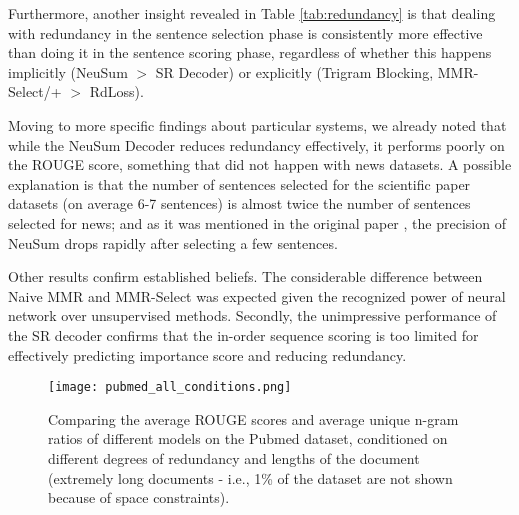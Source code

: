 \documentclass[11pt,a4paper]{article}
\begin{document}
Furthermore, another insight revealed in Table \ref{tab:redundancy} is that dealing with redundancy in the sentence selection phase is consistently more effective than doing it in the sentence scoring phase, regardless of whether this happens implicitly (NeuSum $>$ SR Decoder) or explicitly (Trigram Blocking, MMR-Select/+ $>$ RdLoss).

Moving to more specific findings about particular systems, we already noted that while the NeuSum Decoder reduces redundancy effectively, it performs poorly on the ROUGE score, something that did not happen with news datasets. A possible explanation is that 
the number of sentences selected for the scientific paper datasets (on average 6-7 sentences) is almost twice the number of sentences selected for news;  and as it was mentioned in the original paper \cite{NeuSum}, the precision of NeuSum drops rapidly after selecting a few sentences.


Other results confirm established beliefs. The considerable difference between Naive MMR and MMR-Select was expected given the recognized power of neural network over unsupervised methods. Secondly, the unimpressive performance of the SR decoder confirms that the in-order sequence scoring is too limited for effectively predicting importance score and reducing redundancy. 



\begin{figure*}[h!]
    \centering
\texttt{[image: pubmed\_all\_conditions.png]}
    \caption{Comparing the average ROUGE scores and average unique n-gram ratios of different models on the Pubmed dataset, conditioned on different degrees of redundancy and lengths of the document (extremely long documents - i.e., 1\% of the dataset are not shown because of space constraints).\footnotemark}
    \label{fig:diff_conditions}
\end{figure*}
\vspace{-1mm}
\end{document}

